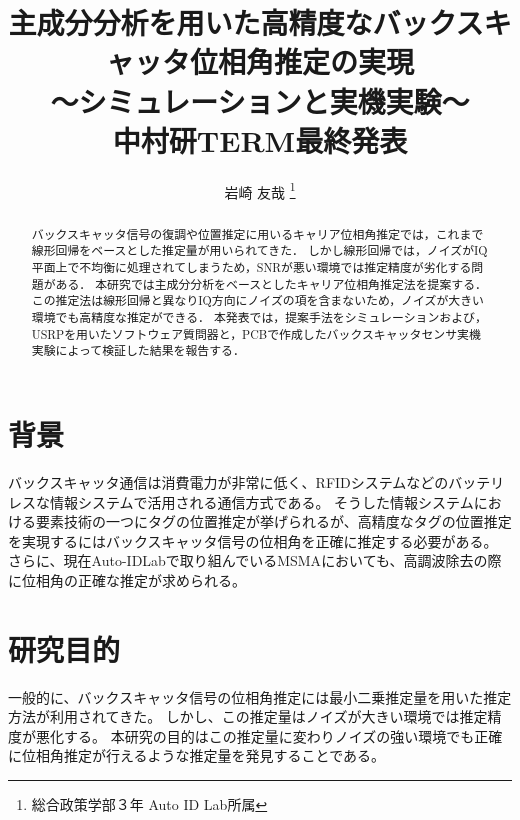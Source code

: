 \documentclass[a4j,10pt]{jsarticle}
\begin{document}

\title{主成分分析を用いた高精度なバックスキャッタ位相角推定の実現 \\
〜シミュレーションと実機実験〜 \\
中村研TERM最終発表}

\author{
    岩崎 友哉 \thanks{総合政策学部３年 Auto ID Lab所属}
}

\begin{abstract}
    バックスキャッタ信号の復調や位置推定に用いるキャリア位相角推定では，これまで線形回帰をベースとした推定量が用いられてきた．
    しかし線形回帰では，ノイズがIQ平面上で不均衡に処理されてしまうため，SNRが悪い環境では推定精度が劣化する問題がある．
    本研究では主成分分析をベースとしたキャリア位相角推定法を提案する．
    この推定法は線形回帰と異なりIQ方向にノイズの項を含まないため，ノイズが大きい環境でも高精度な推定ができる．
    本発表では，提案手法をシミュレーションおよび，USRPを用いたソフトウェア質問器と，PCBで作成したバックスキャッタセンサ実機実験によって検証した結果を報告する．
\end{abstract}

\maketitle
\thispagestyle{empty}

\section{背景}
バックスキャッタ通信は消費電力が非常に低く、RFIDシステムなどのバッテリレスな情報システムで活用される通信方式である。
そうした情報システムにおける要素技術の一つにタグの位置推定\cite{Localization}が挙げられるが、高精度なタグの位置推定を実現するにはバックスキャッタ信号の位相角を正確に推定する必要がある。
さらに、現在Auto-IDLabで取り組んでいるMSMA\cite{MSMA}においても、高調波除去の際に位相角の正確な推定が求められる。



\section{研究目的}
一般的に、バックスキャッタ信号の位相角推定には最小二乗推定量を用いた推定方法が利用されてきた。
しかし、この推定量はノイズが大きい環境では推定精度が悪化する。
本研究の目的はこの推定量に変わりノイズの強い環境でも正確に位相角推定が行えるような推定量を発見することである。
\end{document}
